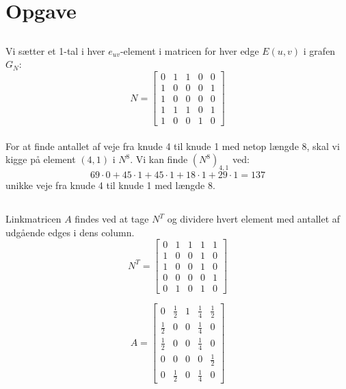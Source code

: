\documentclass[a4paper,12pt]{article}
\begin{document}
\section[Opgave]{Opgave}
\subsection{}
Vi sætter et 1-tal i hver $e_{uv}$-element i matricen for hver edge $E(u,v)$ i grafen $G_N$:\\

\[
N = 
\left[\begin{array}{ccccc}
    0 & 1 & 1 & 0 & 0 \\
    1 & 0 & 0 & 0 & 1 \\
    1 & 0 & 0 & 0 & 0 \\
    1 & 1 & 1 & 0 & 1 \\
    1 & 0 & 0 & 1 & 0 
\end{array}\right]
\]\\

For at finde antallet af veje fra knude 4 til knude 1 med netop længde 8, skal vi kigge på element $(4,1)$ i $N^8$. Vi kan finde $(N^8)_{4,1}$ ved:\\
\[
69 \cdot 0 + 45 \cdot 1 + 45 \cdot 1 + 18 \cdot 1 + 29 \cdot 1 = 137
\]
unikke veje fra knude 4 til knude 1 med længde 8.\\

\subsection{}
Linkmatricen $A$ findes ved at tage $N^T$ og dividere hvert element med antallet af udgående edges i dens column.\\
\[
N^T =
\left[\begin{array}{ccccc}
    0 & 1 & 1 & 1 & 1 \\
    1 & 0 & 0 & 1 & 0 \\
    1 & 0 & 0 & 1 & 0 \\
    0 & 0 & 0 & 0 & 1 \\
    0 & 1 & 0 & 1 & 0
\end{array}\right]
\]


\[
A =
\left[\begin{array}{ccccc}
    0 & \frac{1}{2} & 1 & \frac{1}{4} & \frac{1}{2} \\
    \frac{1}{2} & 0 & 0 & \frac{1}{4} & 0 \\
    \frac{1}{2} & 0 & 0 & \frac{1}{4} & 0 \\
    0 & 0 & 0 & 0 & \frac{1}{2} \\
    0 & \frac{1}{2} & 0 & \frac{1}{4} & 0
\end{array}\right]
\]
\end{document}
